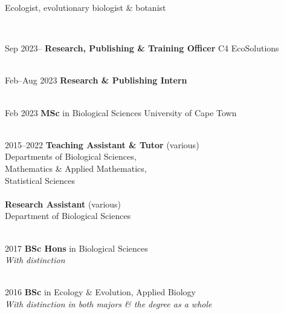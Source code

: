 \documentclass[12pt]{article}
\begin{document}



\bigskip

\begin{center}
  Ecologist, evolutionary biologist \& botanist
\end{center}

\

Sep 2023-- \hspace{1.65em} \textbf{Research, Publishing \& Training Officer}
           \hfill C4 EcoSolutions \\
\

Feb--Aug 2023 \hspace{0.5em} \textbf{Research \& Publishing Intern} \\
\

Feb 2023   \hspace{2.25em} \textbf{MSc} in Biological Sciences
           \hfill University of Cape Town \\
\

2015--2022 \hspace{1.5em} \textbf{Teaching Assistant \& Tutor} (various) \\
           \hspace{6.75em} Departments of Biological Sciences, \\
                            \hspace{13em} Mathematics \& Applied Mathematics, \\
                            \hspace{13em} Statistical Sciences \\
           \ \\
           \hspace{6.75em} \textbf{Research Assistant} (various) \\
           \hspace{6.75em} Department of Biological Sciences \\
\

2017       \hspace{4.25em} \textbf{BSc Hons} in Biological Sciences \\
           \hspace{6.75em} \textit{With distinction} \\
\

2016       \hspace{4.25em} \textbf{BSc} in Ecology \& Evolution, Applied Biology \\
           \hspace{6.75em} \textit{With distinction in both majors \& the degree as a whole} \\
\
\end{document}
